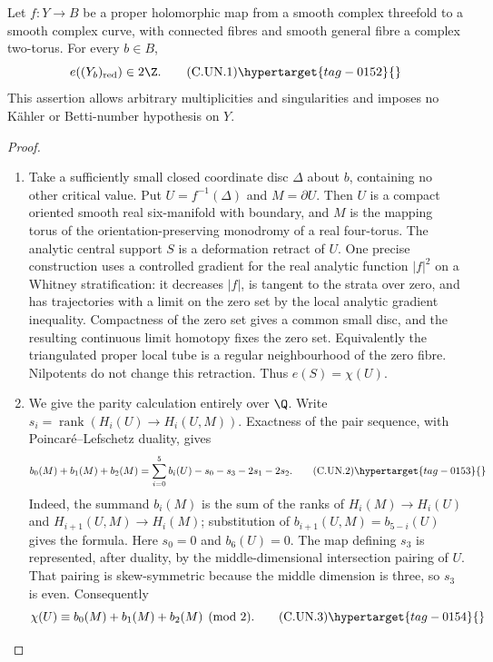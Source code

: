 \begin{proposition}\hypertarget{tag-01CM}{}\label{cdp:st:C.2.UN.1}

Let $f:Y\to B$ be a proper holomorphic map from a smooth complex
threefold to a smooth complex curve, with connected fibres and smooth
general fibre a complex two-torus. For every $b\in B$,
\[
                    e((Y_b)_{\rm red})\in2\Z.       \tag{C.UN.1}\hypertarget{tag-0152}{}\label{cdp:eq:C.UN.1}
\]
This assertion allows arbitrary multiplicities and singularities and
imposes no K\"ahler or Betti-number hypothesis on $Y$.
\end{proposition}


\begin{proof}

\begin{enumerate}[label={$\langle1\rangle$\arabic*.},leftmargin=*]
\item Take a sufficiently small closed coordinate disc $\Delta$ about $b$,
containing no other critical value. Put $U=f^{-1}(\Delta)$ and
$M=\partial U$. Then $U$ is a compact oriented smooth real six-manifold
with boundary, and $M$ is the mapping torus of the orientation-preserving
monodromy of a real four-torus. The analytic central support $S$ is a
deformation retract of $U$. One precise construction uses a controlled
gradient for the real analytic function $|f|^2$ on a Whitney
stratification: it decreases $|f|$, is tangent to the strata over zero,
and has trajectories with a limit on the zero set by the local
analytic gradient inequality. Compactness of the zero set gives a
common small disc, and the resulting continuous limit homotopy fixes
the zero set. Equivalently the triangulated proper local tube is a
regular neighbourhood of the zero fibre. Nilpotents do not change this
retraction. Thus $e(S)=\chi(U)$.

\item We give the parity calculation entirely over $\Q$. Write
$s_i=\operatorname{rank}(H_i(U)\to H_i(U,M))$.
Exactness of the pair sequence, with Poincar\'e--Lefschetz duality,
gives
\[
 b_0(M)+b_1(M)+b_2(M)
       =\sum_{i=0}^{5}b_i(U)-s_0-s_3-2s_1-2s_2.
                                                        \tag{C.UN.2}\hypertarget{tag-0153}{}\label{cdp:eq:C.UN.2}
\]
Indeed, the summand $b_i(M)$ is the sum of the ranks of
$H_i(M)\to H_i(U)$ and $H_{i+1}(U,M)\to H_i(M)$;
substitution of $b_{i+1}(U,M)=b_{5-i}(U)$ gives the formula.
Here $s_0=0$ and $b_6(U)=0$. The map defining $s_3$ is represented,
after duality, by the middle-dimensional intersection pairing of $U$.
That pairing is skew-symmetric because the middle dimension is three,
so $s_3$ is even. Consequently
\[
 \chi(U)\equiv b_0(M)+b_1(M)+b_2(M)\pmod2.            \tag{C.UN.3}\hypertarget{tag-0154}{}\label{cdp:eq:C.UN.3}
\]


\end{enumerate}
\end{proof}
